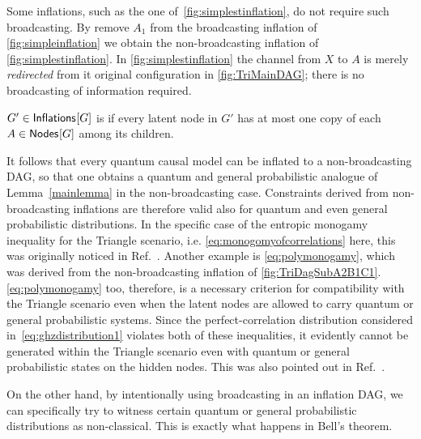 Some inflations, such as the one of~\cref{fig:simplestinflation}, do not require such broadcasting. By remove $A_1$ from the broadcasting inflation of \cref{fig:simpleinflation} we obtain the non-broadcasting inflation of \cref{fig:simplestinflation}. In \cref{fig:simplestinflation} the channel from $X$ to $A$ is merely \emph{redirected} from it original configuration in \cref{fig:TriMainDAG}; there is no broadcasting of information required.

\begin{definition}
	$G'\in{\operatorname{\mathsf{Inflations}}_{}}\lbrack G\rbrack$ is  if every latent node in $G'$ has at most one copy of each $A\in{\operatorname{\mathsf{Nodes}}_{}}\lbrack G\rbrack$ among its children.
\end{definition}

It follows that every quantum causal model can be inflated to a non-broadcasting DAG, so that one obtains a quantum and general probabilistic analogue of Lemma~\ref{mainlemma} in the non-broadcasting case. Constraints derived from non-broadcasting inflations are therefore valid also for quantum and even general probabilistic distributions. In the specific case of the entropic monogamy inequality for the Triangle scenario, i.e. \cref{eq:monogomyofcorrelations} here, this was originally noticed in Ref.~\cite{pusey2014gdag}. Another example is \cref{eq:polymonogamy}, which was derived from the non-broadcasting inflation of \cref{fig:TriDagSubA2B1C1}. \cref{eq:polymonogamy} too, therefore, is a necessary criterion for compatibility with the Triangle scenario even when the latent nodes are allowed to carry quantum or general probabilistic systems.
Since the perfect-correlation distribution considered in~\cref{eq:ghzdistribution1} violates both of these inequalities, it evidently cannot be generated within the Triangle scenario even with quantum or general probabilistic states on the hidden nodes. This was also pointed out in Ref.~\cite{pusey2014gdag}.


On the other hand, by intentionally using broadcasting in an inflation DAG, we can specifically try to witness certain quantum or general probabilistic distributions as non-classical. This is exactly what happens in Bell's theorem.

